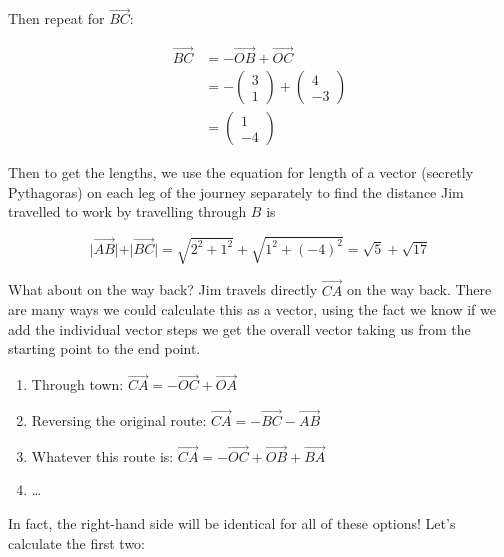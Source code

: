 \begin{solution}
    Then repeat for $\vec{BC}$:

    \begin{align*}
        \vec{BC} &= -\vec{OB} + \vec{OC} \\
        &= - \begin{pmatrix}3\\1\end{pmatrix} + \begin{pmatrix}4\\-3\end{pmatrix} \\
        &= \begin{pmatrix}1\\-4\end{pmatrix}
    \end{align*}

    Then to get the lengths, we use the equation for length of a vector (secretly Pythagoras) on each leg of the journey separately to find the distance Jim travelled to work by travelling through $B$ is

    \[ \vert \vec{AB} \vert + \vert \vec{BC} \vert  = \sqrt{2^2 + 1^2} + \sqrt{1^2 + (-4)^2} = \sqrt{5} + \sqrt{17}\]

    What about on the way back? Jim travels directly $\vec{CA}$ on the way back. There are many ways we could calculate this as a vector, using 
    the fact we know if we add the individual vector steps we get the overall vector taking us from the starting point to the end point.

    \begin{enumerate}
        \item Through town: $\vec{CA} = -\vec{OC} + \vec{OA}$
        \item Reversing the original route: $\vec{CA} = -\vec{BC} - \vec{AB}$
        \item Whatever this route is: $\vec{CA} = -\vec{OC} + \vec{OB} + \vec{BA}$
        \item \dots
    \end{enumerate}
    In fact, the right-hand side will be identical for all of these options! Let's calculate the first two:


\end{solution}
